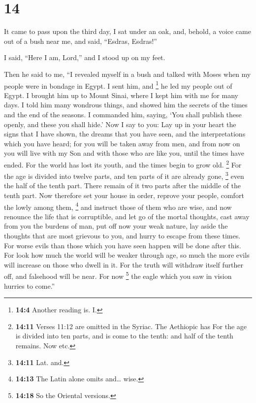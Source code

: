 \hypertarget{section-13}{%
\section{14}\label{section-13}}

 It came to pass upon the third day, I sat under an oak,
and, behold, a voice came out of a bush near me, and said, ``Esdras,
Esdras!''

 I said, ``Here I am, Lord,'' and I stood up on my feet.

 Then he said to me, ``I revealed myself in a bush and
talked with Moses when my people were in bondage in Egypt.
 I sent him, and \footnote{\textbf{14:4} Another reading
  is. I.} he led my people out of Egypt. I brought him up to Mount
Sinai, where I kept him with me for many days.  I told him
many wondrous things, and showed him the secrets of the times and the
end of the seasons. I commanded him, saying,  `You shall
publish these openly, and these you shall hide.'  Now I
say to you:  Lay up in your heart the signs that I have
shown, the dreams that you have seen, and the interpretations which you
have heard;  for you will be taken away from men, and from
now on you will live with my Son and with those who are like you, until
the times have ended.  For the world has lost its youth,
and the times begin to grow old.  \footnote{\textbf{14:11}
  Verses 11:12 are omitted in the Syriac. The Aethiopic has For the age
  is divided into ten parts, and is come to the tenth: and half of the
  tenth remains. Now etc.} For the age is divided into twelve parts, and
ten parts of it are already gone, \footnote{\textbf{14:11} Lat. and.}
even the half of the tenth part.  There remain of it two
parts after the middle of the tenth part.  Now therefore
set your house in order, reprove your people, comfort the lowly among
them, \footnote{\textbf{14:13} The Latin alone omits and\ldots{} wise.}
and instruct those of them who are wise, and now renounce the life that
is corruptible,  and let go of the mortal thoughts, cast
away from you the burdens of man, put off now your weak nature,
 lay aside the thoughts that are most grievous to you,
and hurry to escape from these times.  For worse evils
than those which you have seen happen will be done after this.
 For look how much the world will be weaker through age,
so much the more evils will increase on those who dwell in it.
 For the truth will withdraw itself further off, and
falsehood will be near. For now \footnote{\textbf{14:18} So the Oriental
  versions.} the eagle which you saw in vision hurries to come.''

